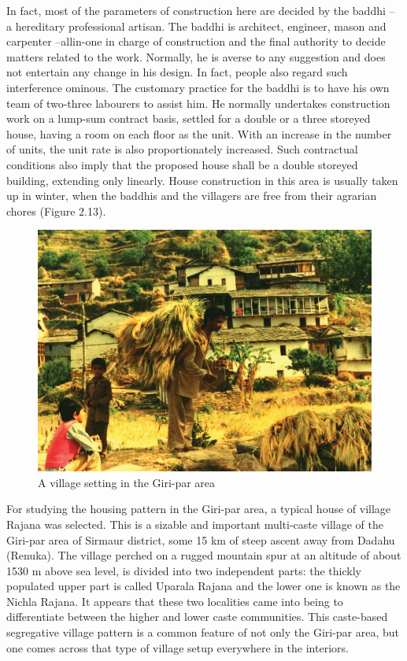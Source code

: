 In fact, most of the parameters of construction here are decided by the baddhi – a hereditary professional artisan. The baddhi is architect, engineer, mason and carpenter –allin-one in charge of construction and the final authority to decide matters related to the work. Normally, he is averse to any suggestion and does not entertain any change in his design. In fact, people also regard such interference ominous. The customary practice for the baddhi is to have his own team of two-three labourers to assist him. He normally undertakes construction work on a lump-sum contract basis, settled for a double or a three storeyed house, having a room on each floor as the unit. With an increase in the number of units, the unit rate is also proportionately increased. Such contractual conditions also imply that the proposed house shall be a double storeyed building, extending only linearly. House construction in this area is usually taken up in winter, when the baddhis and the villagers are free from their agrarian chores (Figure 2.13).

\begin{figure}[!htbp]
\includegraphics[scale=.34]{images/chap02-13.jpg}
\caption{A village setting in the Giri-par area}\label{chap02-fig13}
\end{figure}

For studying the housing pattern in the Giri-par area, a typical house of village Rajana was selected. This is a sizable and important multi-caste village of the Giri-par area of Sirmaur district, some 15 km of steep ascent away from Dadahu (Renuka). The village perched on a rugged mountain spur at an altitude of about 1530 m above sea level, is divided into two independent parts: the thickly populated upper part is called Uparala Rajana and the lower one is known as the Nichla Rajana. It appears that these two localities came into being to differentiate between the higher and lower caste communities. This caste-based segregative village pattern is a common feature of not only the Giri-par area, but one comes across that type of village setup everywhere in the interiors.

